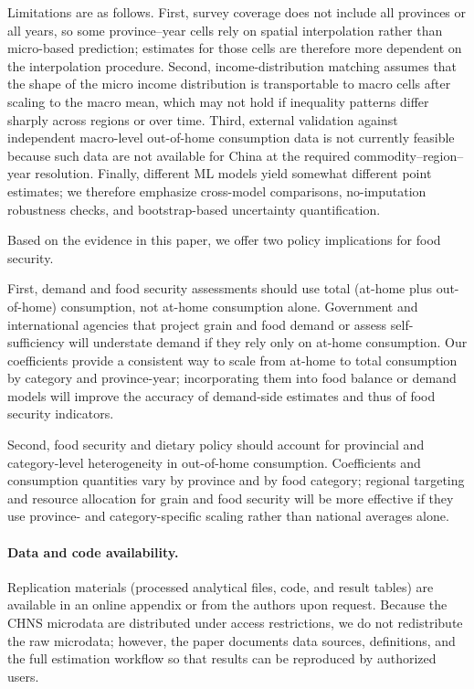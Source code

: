 \documentclass[12pt,a4paper]{article}
\begin{document}
Limitations are as follows. First, survey coverage does not include all provinces or all years, so some province--year cells rely on spatial interpolation rather than micro-based prediction; estimates for those cells are therefore more dependent on the interpolation procedure. Second, income-distribution matching assumes that the shape of the micro income distribution is transportable to macro cells after scaling to the macro mean, which may not hold if inequality patterns differ sharply across regions or over time. Third, external validation against independent macro-level out-of-home consumption data is not currently feasible because such data are not available for China at the required commodity--region--year resolution. Finally, different ML models yield somewhat different point estimates; we therefore emphasize cross-model comparisons, no-imputation robustness checks, and bootstrap-based uncertainty quantification.

Based on the evidence in this paper, we offer two policy implications for food security.

First, demand and food security assessments should use total (at-home plus out-of-home) consumption, not at-home consumption alone. Government and international agencies that project grain and food demand or assess self-sufficiency will understate demand if they rely only on at-home consumption. Our coefficients provide a consistent way to scale from at-home to total consumption by category and province-year; incorporating them into food balance or demand models will improve the accuracy of demand-side estimates and thus of food security indicators.

Second, food security and dietary policy should account for provincial and category-level heterogeneity in out-of-home consumption. Coefficients and consumption quantities vary by province and by food category; regional targeting and resource allocation for grain and food security will be more effective if they use province- and category-specific scaling rather than national averages alone.

\paragraph{Data and code availability.} Replication materials (processed analytical files, code, and result tables) are available in an online appendix or from the authors upon request. Because the CHNS microdata are distributed under access restrictions, we do not redistribute the raw microdata; however, the paper documents data sources, definitions, and the full estimation workflow so that results can be reproduced by authorized users.
\end{document}
